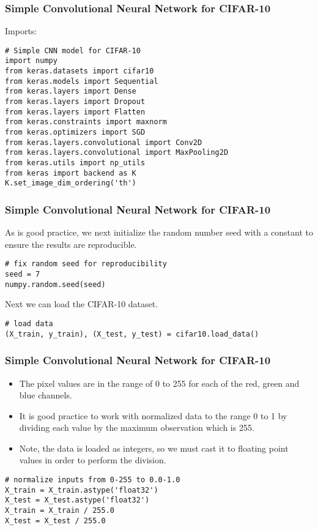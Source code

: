 \begin{frame}[fragile] \frametitle{Simple Convolutional Neural Network for CIFAR-10}
Imports:
\begin{lstlisting}
# Simple CNN model for CIFAR-10
import numpy
from keras.datasets import cifar10
from keras.models import Sequential
from keras.layers import Dense
from keras.layers import Dropout
from keras.layers import Flatten
from keras.constraints import maxnorm
from keras.optimizers import SGD
from keras.layers.convolutional import Conv2D
from keras.layers.convolutional import MaxPooling2D
from keras.utils import np_utils
from keras import backend as K
K.set_image_dim_ordering('th')
\end{lstlisting}

\end{frame}

\begin{frame}[fragile] \frametitle{Simple Convolutional Neural Network for CIFAR-10}
As is good practice, we next initialize the random number seed with a constant to ensure the results are reproducible.
\begin{lstlisting}
# fix random seed for reproducibility
seed = 7
numpy.random.seed(seed)
\end{lstlisting}
Next we can load the CIFAR-10 dataset.
\begin{lstlisting}
# load data
(X_train, y_train), (X_test, y_test) = cifar10.load_data()
\end{lstlisting}
\end{frame}

\begin{frame}[fragile] \frametitle{Simple Convolutional Neural Network for CIFAR-10}
\begin{itemize}
\item The pixel values are in the range of 0 to 255 for each of the red, green and blue channels.
\item It is good practice to work with normalized data to the range 0 to 1 by dividing each value by the maximum observation which is 255.
\item Note, the data is loaded as integers, so we must cast it to floating point values in order to perform the division.
\end{itemize}
\begin{lstlisting}
# normalize inputs from 0-255 to 0.0-1.0
X_train = X_train.astype('float32')
X_test = X_test.astype('float32')
X_train = X_train / 255.0
X_test = X_test / 255.0
\end{lstlisting}
\end{frame}

